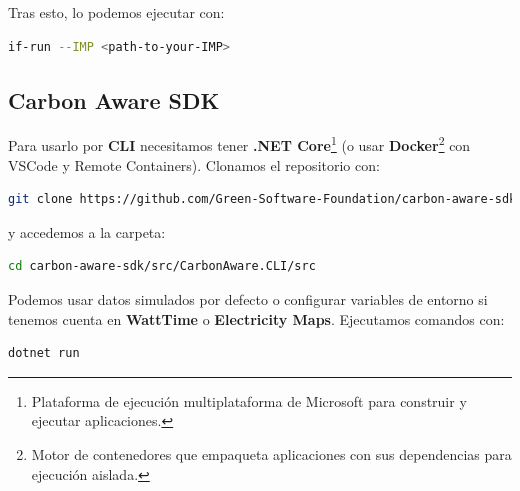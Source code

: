 \documentclass[12pt,a4paper]{report}
\begin{document}
Tras esto, lo podemos ejecutar con:

\begin{tcolorbox}[colback=codebackground, colframe=codeborder, boxrule=0.8pt, arc=0mm, boxsep=5pt, left=5pt, right=5pt, top=5pt, bottom=5pt]
  \begin{lstlisting}[language=bash]
  if-run --IMP <path-to-your-IMP>
  \end{lstlisting}
\end{tcolorbox}

\subsection{Carbon Aware SDK}
Para usarlo por \textbf{CLI} necesitamos
tener \textbf{.NET Core}\footnote{Plataforma de ejecución multiplataforma de
  Microsoft para construir y ejecutar aplicaciones.} (o usar
\textbf{Docker}\footnote{Motor de contenedores que empaqueta aplicaciones con
  sus dependencias para ejecución aislada.} con VSCode y Remote Containers).
Clonamos el repositorio con:

\begin{tcolorbox}[colback=codebackground, colframe=codeborder, boxrule=0.8pt, arc=0mm, boxsep=5pt, left=5pt, right=5pt, top=5pt, bottom=5pt]
  \begin{lstlisting}[language=bash]
git clone https://github.com/Green-Software-Foundation/carbon-aware-sdk.git
\end{lstlisting}
\end{tcolorbox}

y accedemos a la carpeta:

\begin{tcolorbox}[colback=codebackground, colframe=codeborder, boxrule=0.8pt, arc=0mm, boxsep=5pt, left=5pt, right=5pt, top=5pt, bottom=5pt]
  \begin{lstlisting}[language=bash]
cd carbon-aware-sdk/src/CarbonAware.CLI/src
\end{lstlisting}
\end{tcolorbox}

Podemos usar datos simulados por defecto o configurar variables de entorno si
tenemos cuenta en \textbf{WattTime} o
\textbf{Electricity Maps}. Ejecutamos
comandos con:

\begin{tcolorbox}[colback=codebackground, colframe=codeborder, boxrule=0.8pt, arc=0mm, boxsep=5pt, left=5pt, right=5pt, top=5pt, bottom=5pt]
  \begin{lstlisting}[language=bash]
dotnet run
\end{lstlisting}
\end{tcolorbox}
\end{document}
